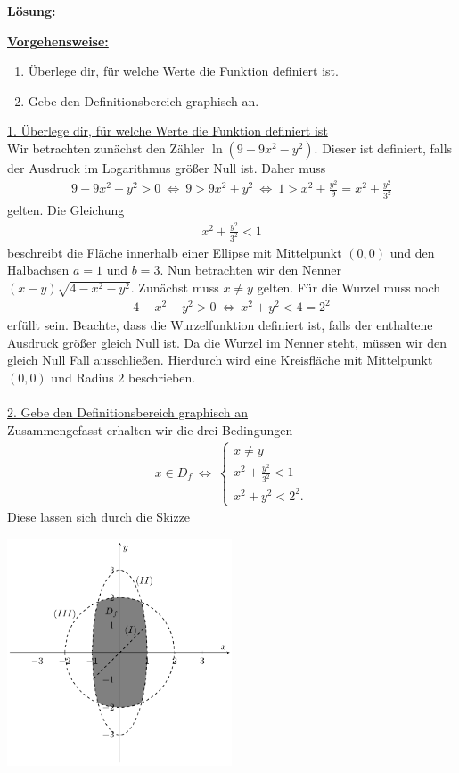 \textbf{Lösung:}
\begin{mdframed}
\underline{\textbf{Vorgehensweise:}}
\renewcommand{\labelenumi}{\theenumi.}
\begin{enumerate}
\item Überlege dir, für welche Werte die Funktion definiert ist.
\item Gebe den Definitionsbereich graphisch an.
\end{enumerate}
\end{mdframed}

\underline{1. Überlege dir, für welche Werte die Funktion definiert ist}\\
Wir betrachten zunächst den Zähler $ \ln(9 - 9 x^2 - y^2) $. 
Dieser ist definiert, falls der Ausdruck im Logarithmus größer Null ist. Daher muss
\begin{align*}
9 - 9x^2 -y^2  > 0 
\ 
\Leftrightarrow \
9 > 9x^2 + y^2
\
\Leftrightarrow
\
1 > x^2 + \frac{y^2}{9} = x^2 + \frac{y^2}{3^2}
\end{align*}
gelten. Die Gleichung
\begin{align*}
x^2  + \frac{y^2}{3^2} < 1
\end{align*}
beschreibt die Fläche innerhalb einer Ellipse mit Mittelpunkt $ (0,0) $ und den Halbachsen $ a = 1 $ und $ b = 3 $.
Nun betrachten wir den Nenner $ (x-y) \sqrt{4 - x^2 - y^2} $. Zunächst muss $ x \neq y $ gelten. 
Für die Wurzel muss noch
\begin{align*}
4 -x^2 - y^2 > 0
\
\Leftrightarrow
\
x^2 + y^2 < 4 = 2^2
\end{align*}
erfüllt sein.
Beachte, dass die Wurzelfunktion definiert ist, falls der enthaltene Ausdruck größer gleich Null ist.
Da die Wurzel im Nenner steht, müssen wir den gleich Null Fall ausschließen.
Hierdurch wird eine Kreisfläche mit Mittelpunkt $ (0,0) $ und Radius $ 2 $ beschrieben.
\\
\\
\underline{2. Gebe den Definitionsbereich graphisch an}\\
Zusammengefasst erhalten wir die drei Bedingungen
\begin{align*}
x \in D_f \
\Leftrightarrow
\
\begin{cases}
x \neq y\\
x^2  + \frac{y^2}{3^2} < 1\\
x^2 + y^2 <  2^2.
\end{cases}
\end{align*}
Diese lassen sich durch die Skizze
\begin{center}
	\includegraphics[width=0.5\textwidth]{pictures/auf2_b.png}
\end{center}
